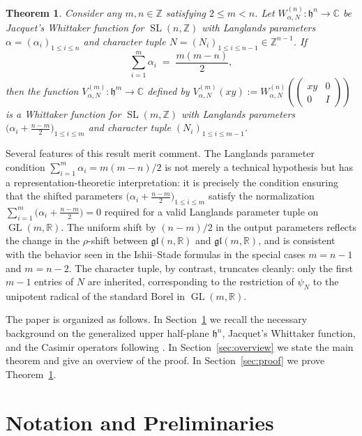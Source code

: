 \documentclass[12pt, reqno, oneside]{amsart}
\newtheorem{theorem}{Theorem}[section]
\theoremstyle{definition}
\numberwithin{equation}{section}
\newcommand{\Z}{\mathbb{Z}}
\newcommand{\R}{\mathbb{R}}
\newcommand{\C}{\mathbb{C}}
\newcommand{\hh}{\mathfrak{h}}
\newcommand{\gl}{\mathfrak{gl}}
\DeclareMathOperator{\GL}{GL}
\DeclareMathOperator{\SL}{SL}
\begin{document}
\begin{theorem}\label{thm:main-thm}
Consider any $m,n\in\Z$ satisfying $2\leq m<n$. Let
$W_{\alpha,N}^{(n)}:\hh^n\to\C$ be Jacquet's Whittaker function for
$\SL(n,\Z)$ with Langlands parameters $\alpha=(\alpha_i)_{1\leq i\leq n}$
and character tuple $N=(N_i)_{1\leq i\leq n-1}\in\Z^{n-1}$. If
\[
  \sum_{i=1}^m \alpha_i \;=\; \frac{m(m-n)}{2},
\]
then the function $V_{\alpha,N}^{(m)}:\hh^m\to\C$ defined by
$V_{\alpha,N}^{(m)}(xy):=W_{\alpha,N}^{(n)}\!\left(\left(\begin{smallmatrix}
xy & 0 \\ 0 & I\end{smallmatrix}\right)\right)$ is a Whittaker function for
$\SL(m,\Z)$ with Langlands parameters $\bigl(\alpha_i+\frac{n-m}{2}\bigr)_{1\leq
i\leq m}$ and character tuple $(N_i)_{1\leq i\leq m-1}$.
\end{theorem}

Several features of this result merit comment. The Langlands parameter
condition $\sum_{i=1}^m\alpha_i=m(m-n)/2$ is not merely a technical
hypothesis but has a representation-theoretic interpretation: it is
precisely the condition ensuring that the shifted parameters
$\bigl(\alpha_i+\frac{n-m}{2}\bigr)_{1\leq i\leq m}$ satisfy the
normalization $\sum_{i=1}^m\bigl(\alpha_i+\frac{n-m}{2}\bigr)=0$ required
for a valid Langlands parameter tuple on $\GL(m,\R)$. The uniform shift
by $(n-m)/2$ in the output parameters reflects the change in the
$\rho$-shift between $\gl(n,\R)$ and $\gl(m,\R)$, and is consistent with
the behavior seen in the Ishii--Stade formulas in the special cases
$m=n-1$ and $m=n-2$. The character tuple, by contrast, truncates cleanly:
only the first $m-1$ entries of $N$ are inherited, corresponding to the
restriction of $\psi_N$ to the unipotent radical of the standard Borel in
$\GL(m,\R)$.

The paper is organized as follows. In Section~\ref{sec:background} we
recall the necessary background on the generalized upper half-plane
$\hh^n$, Jacquet's Whittaker function, and the Casimir operators following
\cite{Gol06}. In Section~\ref{sec:overview} we state the main theorem and
give an overview of the proof. In Section~\ref{sec:proof} we prove
Theorem~\ref{thm:main-thm}.

\section{Notation and Preliminaries}
\label{sec:background}
\end{document}
